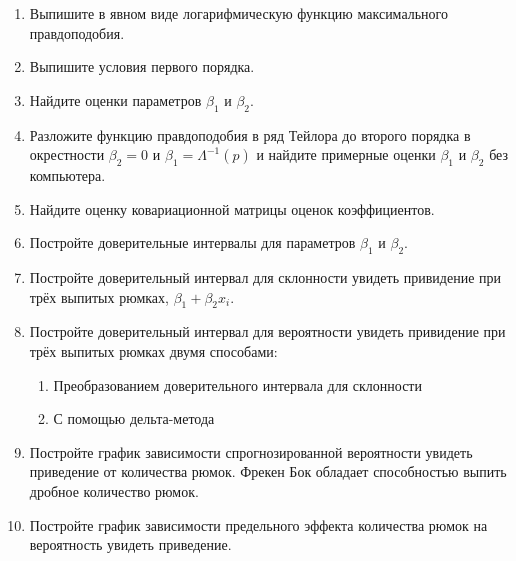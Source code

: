 \begin{problem}
\begin{enumerate}
\item Выпишите в явном виде логарифмическую функцию максимального правдоподобия.
\item Выпишите условия первого порядка.
\item \useR Найдите оценки параметров $\beta_1$ и $\beta_2$.
\item Разложите функцию правдоподобия в ряд Тейлора до второго порядка в окрестности $\beta_2=0$ и $\beta_1=\Lambda^{-1}(\hat p)$ и найдите примерные оценки $\beta_1$ и $\beta_2$ без компьютера.
\item Найдите оценку ковариационной матрицы оценок коэффициентов.
\item Постройте доверительные интервалы для параметров $\beta_1$ и $\beta_2$.
\item Постройте доверительный интервал для склонности увидеть привидение при трёх выпитых рюмках, $\beta_1 + \beta_2 x_i$.
\item Постройте доверительный интервал для вероятности увидеть привидение при трёх выпитых рюмках двумя способами:
\begin{enumerate}
\item Преобразованием доверительного интервала для склонности
\item С помощью дельта-метода
\end{enumerate}
\item Постройте график зависимости спрогнозированной вероятности увидеть приведение от количества рюмок. Фрекен Бок обладает способностью выпить дробное количество рюмок.
\item Постройте график зависимости предельного эффекта количества рюмок на вероятность увидеть приведение.
\end{enumerate}


\begin{sol}
\end{sol}
\end{problem}



